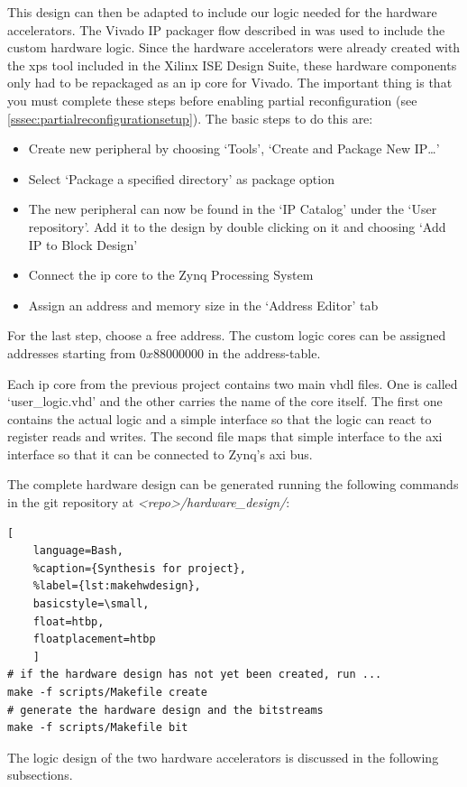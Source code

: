 This design can then be adapted to include our logic needed for the hardware accelerators. The Vivado IP packager flow described in \cite{UG1118} was used to include the custom hardware logic. Since the hardware accelerators were already created with the \gls{xps} tool included in the Xilinx ISE Design Suite, these hardware components only had to be repackaged as an \gls{ip} core for Vivado. The important thing is that you must complete these steps before enabling partial reconfiguration (see \cref{sssec:partialreconfigurationsetup}).
The basic steps to do this are:
\begin{itemize}
	\item Create new peripheral by choosing `Tools', `Create and Package New IP\ldots'
	\item Select `Package a specified directory' as package option
	\item The new peripheral can now be found in the `IP Catalog'
		under the `User repository'.
		Add it to the design by double clicking on it and choosing `Add IP to Block Design'
	\item Connect the \gls{ip} core to the Zynq Processing System
	\item Assign an address and memory size in the `Address Editor' tab
\end{itemize}
For the last step, choose a free address.
The custom logic cores can be assigned addresses starting from $0x88000000$ in the address-table.

Each \gls{ip} core from the previous project contains two main \gls{vhdl} files.
One is called `user\_logic.vhd' and the other carries the name of the core
itself.
The first one contains the actual logic and a simple interface so that the logic can react to register reads and writes.
The second file maps that simple interface to the \gls{axi} interface so that it can be connected to Zynq's \gls{axi} bus.

The complete hardware design can be generated running the following commands in the git repository at \emph{<repo>/hardware\_design/}:

\begin{lstlisting}[
	language=Bash,
	%caption={Synthesis for project},
	%label={lst:makehwdesign},
	basicstyle=\small,
	float=htbp,
	floatplacement=htbp
	]
# if the hardware design has not yet been created, run ...
make -f scripts/Makefile create
# generate the hardware design and the bitstreams
make -f scripts/Makefile bit
\end{lstlisting}
\FloatBarrier

The logic design of the two hardware accelerators is discussed in the following
subsections.
